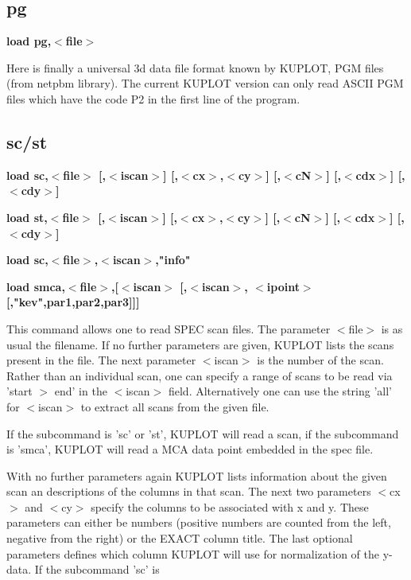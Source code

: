 \subsection*{pg}
{\bf load pg,$ <$file$> $ \par }
\par
\vspace{3pt}
Here is finally a universal 3d data file format known by KUPLOT, 
PGM files (from netpbm library). The current KUPLOT version can 
only read ASCII PGM files which have the code P2 in the first 
line of the program. 
\subsection*{sc/st}
{\bf load sc,$ <$file$> $ [,$ <$iscan$> $] [,$ <$cx$> $,$ <$cy$> $] [,$ <$cN$> $] [,$ <$cdx$> $] [,$ <$cdy$> $] \par }
{\bf load st,$ <$file$> $ [,$ <$iscan$> $] [,$ <$cx$> $,$ <$cy$> $] [,$ <$cN$> $] [,$ <$cdx$> $] [,$ <$cdy$> $] \par }
{\bf load sc,$ <$file$> $,$ <$iscan$> $,"info" \par }
{\bf load smca,$ <$file$> $,[$ <$iscan$> $ [,$ <$iscan$> $, $ <$ipoint$> $ [,"kev",par1,par2,par3]]] \par }
\par
\vspace{3pt}
This command allows one to read SPEC scan files. The parameter 
$ <$file$> $ is as usual the filename. If no further parameters are 
given, KUPLOT lists the scans present in the file. The next 
parameter $ <$iscan$> $ is the number of the scan. Rather than an 
individual scan, one can specify a range of scans to be read 
via 'start $> $ end' in the $ <$iscan$> $ field. Alternatively one can use 
the string 'all' for $ <$iscan$> $ to extract all scans from the 
given file. 
\par
If the subcommand is 'sc' or 'st', KUPLOT will read a scan, 
if the subcommand is 'smca', KUPLOT will read a MCA data point 
embedded in the spec file. 
\par
With no further parameters again KUPLOT lists information about the 
given scan an descriptions of the columns in that scan. The next 
two parameters $ <$cx$> $ and $ <$cy$> $ specify the columns to be associated 
with x and y. These parameters can either be numbers (positive numbers 
are counted from the left, negative from the right) or the EXACT 
column title. The last optional parameters defines which column KUPLOT 
will use for normalization of the y-data. If the subcommand 'sc' is 
